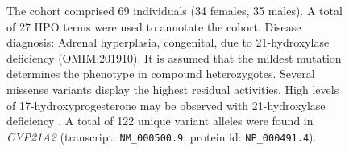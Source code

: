 \begin{figure}[htbp]
\vspace{2em}

\caption{ The cohort comprised 69 individuals (34 females, 35 males). A total of 27 HPO terms were used to annotate the cohort. 
Disease diagnosis: Adrenal hyperplasia, congenital, due to 21-hydroxylase deficiency (OMIM:201910).
It is assumed that the mildest mutation determines the phenotype in compound heterozygotes. Several missense variants display the highest residual activities.
High levels of 17-hydroxyprogesterone may be observed with  21-hydroxylase deficiency \cite{PMID_30968594}.
A total of 122 unique variant alleles were found in \textit{CYP21A2} (transcript: \texttt{NM\_000500.9}, protein id: \texttt{NP\_000491.4}).}
\end{figure}
